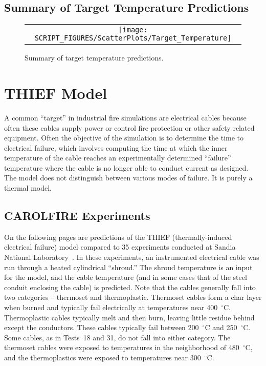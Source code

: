 \clearpage

\subsection{Summary of Target Temperature Predictions}


\begin{figure}[h!]
\begin{center}
\begin{tabular}{c}
\texttt{[image: SCRIPT\_FIGURES/ScatterPlots/Target\_Temperature]}
\end{tabular}
\end{center}
\caption[Summary of target temperature predictions]
{Summary of target temperature predictions.}
\end{figure}

\clearpage


\section{THIEF Model}

A common ``target'' in industrial fire simulations are electrical cables because often these cables supply power or control fire protection or other safety related equipment. Often the objective of the simulation is to determine the time to electrical failure, which involves computing the time at which the inner temperature of the cable reaches an experimentally determined ``failure'' temperature where the cable is no longer able to conduct current as designed. The model does not distinguish between various modes of failure. It is purely a thermal model.


\subsection{CAROLFIRE Experiments}

On the following pages are predictions of the THIEF (thermally-induced electrical failure) model compared to 35 experiments conducted at Sandia National Laboratory~\cite{CAROLFIRE}. In these experiments, an instrumented electrical cable was run through a heated cylindrical ``shroud.'' The shroud temperature is an input for the model, and the cable temperature (and in some cases that of the steel conduit enclosing the cable) is predicted. Note that the cables generally fall into two categories -- thermoset and thermoplastic. Thermoset cables form a char layer when burned and typically fail electrically at temperatures near 400~$^\circ$C. Thermoplastic cables typically melt and then burn, leaving little residue behind except the conductors. These cables typically fail between 200~$^\circ$C and 250~$^\circ$C. Some cables, as in Tests~18 and 31, do not fall into either category. The thermoset cables were exposed to temperatures in the neighborhood of 480~$^\circ$C, and the thermoplastics were exposed to temperatures near 300~$^\circ$C.

